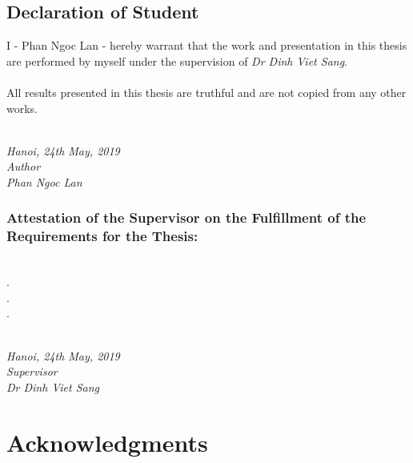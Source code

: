 \documentclass[a4paper, 12pt, oneside]{report}
\begin{document}
\begin{spacing}{1.0}
    \section*{Declaration of Student}
    I - Phan Ngoc Lan - hereby warrant that the work and presentation in this thesis are performed by myself under the supervision of \textit{Dr Dinh Viet Sang}.\\\\
    All results presented in this thesis are truthful and are not copied from any other works.\\\\
    \begin{minipage}{0.5\textwidth}
        \hfill
    \end{minipage}
    \begin{minipage}[t]{0.5\textwidth}
        \begin{center}
        \textit{Hanoi, 24th May, 2019\\Author\\[1cm]Phan Ngoc Lan}
        \end{center}
    \end{minipage}
    \subsection*{Attestation of the Supervisor on the Fulfillment of the
    Requirements for the Thesis:}
    \dotfill\\.\dotfill\\.\dotfill\\.\dotfill\\\\
    \begin{minipage}{0.5\textwidth}
        \hfill
    \end{minipage}
    \begin{minipage}[t]{0.5\textwidth}
        \begin{center}
    \textit{Hanoi, 24th May, 2019\\Supervisor\\[1cm]Dr Dinh Viet Sang}
        \end{center}
    \end{minipage}
\end{spacing}

\chapter*{Acknowledgments}

\pagebreak
\end{document}
